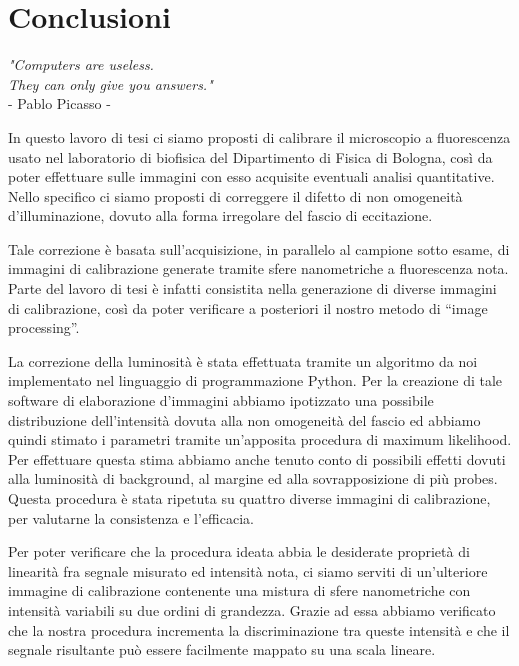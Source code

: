 \clearpage{\pagestyle{empty}\cleardoublepage}

\chapter*{Conclusioni}

\begin{flushright}
\begin{small}\textit{"Computers are useless.\\
 They can only give you answers."}\\
- Pablo Picasso -\\
\end{small}\end{flushright}


In questo lavoro di tesi ci siamo proposti di calibrare il microscopio a fluorescenza usato nel laboratorio di biofisica del Dipartimento di Fisica di Bologna, così da poter effettuare sulle immagini con esso acquisite eventuali analisi quantitative. 
Nello specifico ci siamo proposti di correggere il difetto di non omogeneità d'illuminazione, dovuto alla forma irregolare del fascio di eccitazione. 

Tale correzione è basata sull'acquisizione, in parallelo al campione sotto esame, di immagini di calibrazione generate tramite sfere nanometriche a fluorescenza nota.
Parte del lavoro di tesi è infatti consistita nella generazione di diverse immagini di calibrazione, così da poter verificare a posteriori il nostro metodo di ``image processing''.

La correzione della luminosità è stata effettuata tramite un algoritmo da noi implementato nel linguaggio di programmazione Python.
Per la creazione di tale software di elaborazione d'immagini abbiamo ipotizzato una possibile distribuzione dell'intensità dovuta alla non omogeneità del fascio ed abbiamo quindi stimato i parametri tramite un'apposita procedura di maximum likelihood.
Per effettuare questa stima abbiamo anche tenuto conto di possibili effetti dovuti alla luminosità di background, al margine ed alla sovrapposizione di più probes.
Questa procedura è stata ripetuta su quattro diverse immagini di calibrazione, per valutarne la consistenza e l'efficacia.

Per poter verificare che la procedura ideata abbia le desiderate proprietà di linearità fra segnale misurato ed intensità nota, ci siamo serviti di un'ulteriore immagine di calibrazione contenente una mistura di sfere nanometriche con intensità variabili su due ordini di grandezza.
Grazie ad essa abbiamo verificato che la nostra procedura incrementa la discriminazione tra queste intensità e che il segnale risultante può essere facilmente mappato su una scala lineare. 

